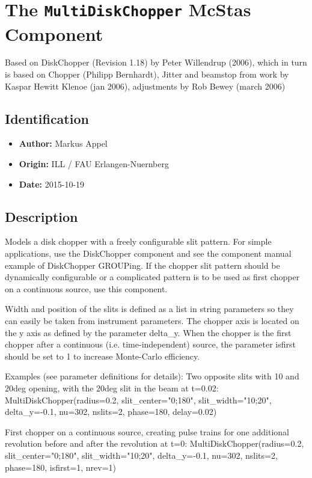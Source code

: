 \section{The \texttt{MultiDiskChopper} McStas Component}
Based on DiskChopper (Revision 1.18) by Peter Willendrup (2006),
which in turn is based on Chopper (Philipp Bernhardt), Jitter and beamstop from work by
Kaspar Hewitt Klenoe (jan 2006), adjustments by Rob Bewey (march 2006)

\subsection*{Identification}
\begin{itemize}
  \item \textbf{Author:} Markus Appel
  \item \textbf{Origin:} ILL / FAU Erlangen-Nuernberg
  \item \textbf{Date:} 2015-10-19
\end{itemize}

\subsection*{Description}
Models a disk chopper with a freely configurable slit pattern. For simple applications, use the DiskChopper component and see the component manual example of DiskChopper GROUPing. If the chopper slit pattern should be dynamically configurable or a complicated pattern is to be used as first chopper on a continuous source, use this component.

Width and position of the slits is defined as a list in string parameters so they can easily be taken from instrument parameters. The chopper axis is located on the y axis as defined by the parameter delta\_y. When the chopper is the first chopper after a continuous (i.e. time-independent) source, the parameter isfirst should be set to 1 to increase Monte-Carlo efficiency.

Examples (see parameter definitions for details): Two opposite slits with 10 and 20deg opening, with the 20deg slit in the beam at t=0.02: MultiDiskChopper(radius=0.2, slit\_center="0;180", slit\_width="10;20", delta\_y=-0.1, nu=302, nslits=2, phase=180, delay=0.02)

First chopper on a continuous source, creating pulse trains for one additional revolution before and after the revolution at t=0: MultiDiskChopper(radius=0.2, slit\_center="0;180", slit\_width="10;20", delta\_y=-0.1, nu=302, nslits=2, phase=180, isfirst=1, nrev=1)

